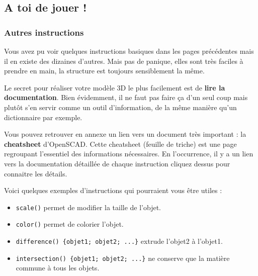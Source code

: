 


\subsection{A toi de jouer !}

\subsubsection{Autres instructions}

Vous avez pu voir quelques instructions basiques dans les pages précédentes mais il en existe des dizaines d'autres.
Mais pas de panique, elles sont très faciles à prendre en main, la structure est toujours sensiblement la même.

Le secret pour réaliser votre modèle 3D le plus facilement est de \textbf{lire la documentation}.
Bien évidemment, il ne faut pas faire ça d'un seul coup mais plutôt s'en servir comme un outil d'information, de la même manière qu'un dictionnaire par exemple.

Vous pouvez retrouver en annexe un lien vers un document très important : la \textbf{cheatsheet} d'OpenSCAD.
Cette cheatsheet (feuille de triche) est une page regroupant l'essentiel des informations nécessaires.
En l'occurrence, il y a un lien vers la documentation détaillée de chaque instruction cliquez dessus pour connaitre les détails.


\vspace{12pt}
Voici quelques exemples d'instructions qui pourraient vous être utiles :
\begin{itemize}
	\item \verb|scale()| permet de modifier la taille de l'objet.
	\item \verb|color()| permet de colorier l'objet.
	\item \verb|difference() {objet1; objet2; ...}| extrude l'objet2 à l'objet1.
	\item \verb|intersection() {objet1; objet2; ...}| ne conserve que la matière commune à tous les objets.
\end{itemize}